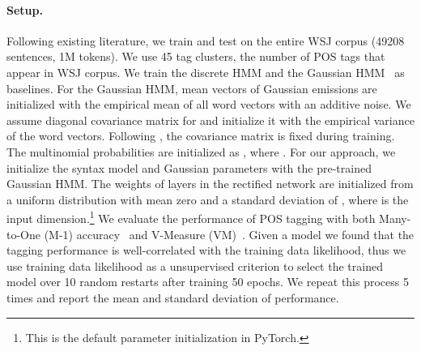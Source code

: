 \documentclass[11pt,a4paper]{article}
\begin{document}
\paragraph{Setup.}
Following existing literature, we train and test on the entire WSJ corpus (49208 sentences, 1M tokens). We use 45 tag clusters, the number of POS tags that appear in WSJ corpus. We train the discrete HMM and the Gaussian HMM~\citep{lin2015unsupervised} as baselines. 
For the Gaussian HMM, mean vectors of Gaussian emissions are initialized with the empirical mean of all word vectors with an additive noise.
We assume diagonal covariance matrix for  and initialize it with the empirical variance of the word vectors. Following \citet{lin2015unsupervised}, the covariance matrix is fixed during training. The multinomial probabilities are initialized as , where .  For our approach, we initialize the syntax model and Gaussian parameters with the pre-trained Gaussian HMM. The weights of layers in the rectified network are initialized from a uniform distribution with mean zero and a standard deviation of , where  is the input dimension.\footnote{This is the default parameter initialization in PyTorch.} We evaluate the performance of POS tagging with both Many-to-One (M-1) accuracy~\citep{johnson2007doesn} and V-Measure (VM)~\citep{rosenberg2007v}. Given a model we found that the tagging performance is well-correlated with the training data likelihood, thus we use training data likelihood as a unsupervised criterion to select the trained model over 10 random restarts after training 50 epochs. We repeat this process 5 times and report the mean and standard deviation of performance.
\end{document}
